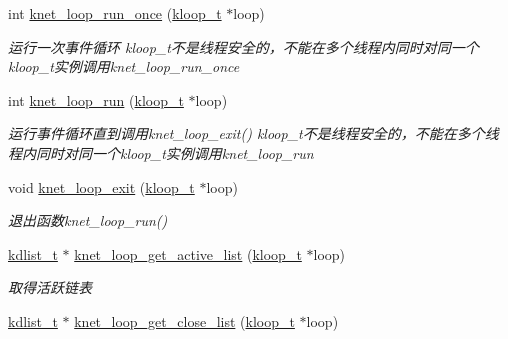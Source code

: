 \begin{DoxyCompactItemize}
int \hyperlink{a00108_ga37ab03493fb1ed037815f2cd951d762a_ga37ab03493fb1ed037815f2cd951d762a}{knet\+\_\+loop\+\_\+run\+\_\+once} (\hyperlink{a00053_a97fc76209a58362019f1ded9169e397f_a97fc76209a58362019f1ded9169e397f}{kloop\+\_\+t} $\ast$loop)
\begin{DoxyCompactList}\small\item\em 运行一次事件循环 kloop\+\_\+t不是线程安全的，不能在多个线程内同时对同一个kloop\+\_\+t实例调用knet\+\_\+loop\+\_\+run\+\_\+once \end{DoxyCompactList}\item 
int \hyperlink{a00108_gaaf104ae1337c32415bd1aa8df545ae31_gaaf104ae1337c32415bd1aa8df545ae31}{knet\+\_\+loop\+\_\+run} (\hyperlink{a00053_a97fc76209a58362019f1ded9169e397f_a97fc76209a58362019f1ded9169e397f}{kloop\+\_\+t} $\ast$loop)
\begin{DoxyCompactList}\small\item\em 运行事件循环直到调用knet\+\_\+loop\+\_\+exit() kloop\+\_\+t不是线程安全的，不能在多个线程内同时对同一个kloop\+\_\+t实例调用knet\+\_\+loop\+\_\+run \end{DoxyCompactList}\item 
void \hyperlink{a00108_ga9e04a2d06c79405f444aa53a26eedd90_ga9e04a2d06c79405f444aa53a26eedd90}{knet\+\_\+loop\+\_\+exit} (\hyperlink{a00053_a97fc76209a58362019f1ded9169e397f_a97fc76209a58362019f1ded9169e397f}{kloop\+\_\+t} $\ast$loop)
\begin{DoxyCompactList}\small\item\em 退出函数knet\+\_\+loop\+\_\+run() \end{DoxyCompactList}\item 
\hyperlink{a00053_ae098586334a621a23cef7cb17590b618_ae098586334a621a23cef7cb17590b618}{kdlist\+\_\+t} $\ast$ \hyperlink{a00071_a5de04251528407b1077e26b8a619936a_a5de04251528407b1077e26b8a619936a}{knet\+\_\+loop\+\_\+get\+\_\+active\+\_\+list} (\hyperlink{a00053_a97fc76209a58362019f1ded9169e397f_a97fc76209a58362019f1ded9169e397f}{kloop\+\_\+t} $\ast$loop)
\begin{DoxyCompactList}\small\item\em 取得活跃链表 \end{DoxyCompactList}\item 
\hyperlink{a00053_ae098586334a621a23cef7cb17590b618_ae098586334a621a23cef7cb17590b618}{kdlist\+\_\+t} $\ast$ \hyperlink{a00071_a768e24c6dbc4a4694397903a0c886d49_a768e24c6dbc4a4694397903a0c886d49}{knet\+\_\+loop\+\_\+get\+\_\+close\+\_\+list} (\hyperlink{a00053_a97fc76209a58362019f1ded9169e397f_a97fc76209a58362019f1ded9169e397f}{kloop\+\_\+t} $\ast$loop)

\end{DoxyCompactItemize}
